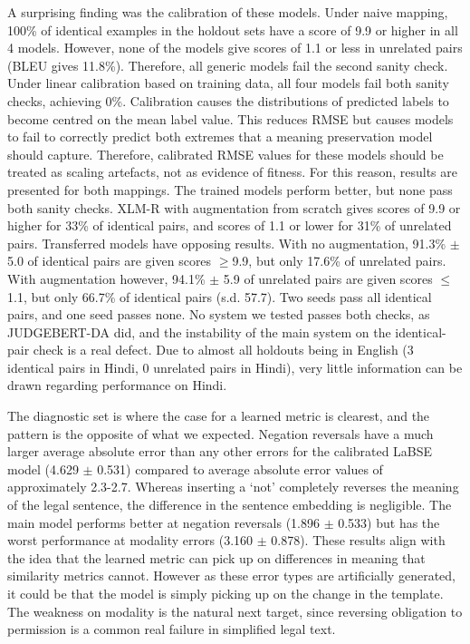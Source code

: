 \documentclass[conference]{IEEEtran}
\begin{document}
A surprising finding was the calibration of these models. Under naive mapping, 100\% of identical examples in the holdout sets have a score of 9.9 or higher in all 4 models. However, none of the models give scores of 1.1 or less in unrelated pairs (BLEU gives 11.8\%). Therefore, all generic models fail the second sanity check. Under linear calibration based on training data, all four models fail both sanity checks, achieving 0\%. Calibration causes the distributions of predicted labels to become centred on the mean label value. This reduces RMSE but causes models to fail to correctly predict both extremes that a meaning preservation model should capture. Therefore, calibrated RMSE values for these models should be treated as scaling artefacts, not as evidence of fitness. For this reason, results are presented for both mappings. The trained models perform better, but none pass both sanity checks. XLM-R with augmentation from scratch gives scores of 9.9 or higher for 33\% of identical pairs, and scores of 1.1 or lower for 31\% of unrelated pairs. Transferred models have opposing results. With no augmentation, 91.3\% \ensuremath{\pm} 5.0 of identical pairs are given scores \ensuremath{\geq}9.9, but only 17.6\% of unrelated pairs. With augmentation however, 94.1\% \ensuremath{\pm} 5.9 of unrelated pairs are given scores \ensuremath{\leq}1.1, but only 66.7\% of identical pairs (s.d. 57.7). Two seeds pass all identical pairs, and one seed passes none. No system we tested passes both checks, as JUDGEBERT-DA did, and the instability of the main system on the identical-pair check is a real defect. Due to almost all holdouts being in English (3 identical pairs in Hindi, 0 unrelated pairs in Hindi), very little information can be drawn regarding performance on Hindi.

The diagnostic set is where the case for a learned metric is clearest, and the pattern is the opposite of what we expected. Negation reversals have a much larger average absolute error than any other errors for the calibrated LaBSE model (4.629 \ensuremath{\pm} 0.531) compared to average absolute error values of approximately 2.3-2.7. Whereas inserting a ‘not’ completely reverses the meaning of the legal sentence, the difference in the sentence embedding is negligible. The main model performs better at negation reversals (1.896 \ensuremath{\pm} 0.533) but has the worst performance at modality errors (3.160 \ensuremath{\pm} 0.878). These results align with the idea that the learned metric can pick up on differences in meaning that similarity metrics cannot. However as these error types are artificially generated, it could be that the model is simply picking up on the change in the template. The weakness on modality is the natural next target, since reversing obligation to permission is a common real failure in simplified legal text.
\end{document}
